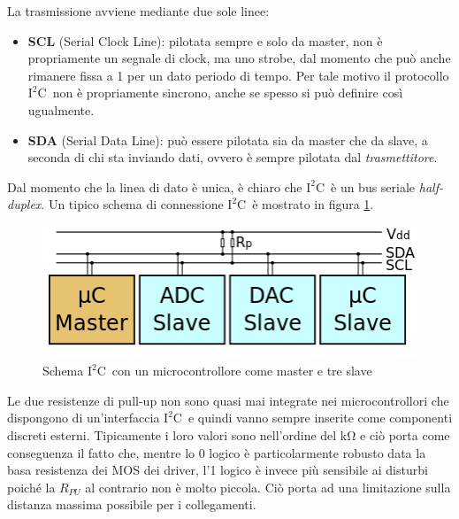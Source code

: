 \documentclass[11pt,4paper]{report}
\newcommand{\iic}{$\text{I}^2\text{C}$}
\begin{document}
La trasmissione avviene mediante due sole linee:
\begin{itemize}
	\item \textbf{SCL} (Serial Clock Line): pilotata sempre e solo da master, non è propriamente un segnale di clock, ma uno strobe, dal momento che può anche rimanere fissa a 1 per un dato periodo di tempo. Per tale motivo il protocollo \iic\ non è propriamente sincrono, anche se spesso si può definire così ugualmente.
	\item \textbf{SDA} (Serial Data Line): può essere pilotata sia da master che da slave, a seconda di chi sta inviando dati, ovvero è sempre pilotata dal \emph{trasmettitore}.
\end{itemize}
Dal momento che la linea di dato è unica, è chiaro che \iic\ è un bus seriale \emph{half-duplex}. Un tipico schema di connessione \iic\ è mostrato in figura \ref{fig:iic_example}.
\begin{figure}[H]
	\centering
	\includegraphics[width=0.5\linewidth]{seriali/iic_example.png}
	\caption{Schema \iic\ con un microcontrollore come master e tre slave}
	\label{fig:iic_example}
\end{figure}
Le due resistenze di pull-up non sono quasi mai integrate nei microcontrollori che dispongono di un'interfaccia \iic\ e quindi vanno sempre inserite come componenti discreti esterni. Tipicamente i loro valori sono nell'ordine del \si{\kilo\ohm} e ciò porta come conseguenza il fatto che, mentre lo 0 logico è particolarmente robusto data la basa resistenza dei MOS dei driver, l'1 logico è invece più sensibile ai disturbi poiché la $R_{PU}$ al contrario non è molto piccola. Ciò porta ad una limitazione sulla distanza massima possibile per i collegamenti.
\end{document}

